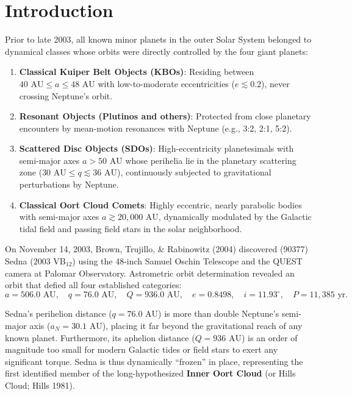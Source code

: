 \documentclass[11pt,a4paper]{article}
\begin{document}
\section{Introduction}
Prior to late 2003, all known minor planets in the outer Solar System belonged to dynamical classes whose orbits were directly controlled by the four giant planets:
\begin{enumerate}
    \item \textbf{Classical Kuiper Belt Objects (KBOs)}: Residing between $40\text{ AU} \le a \le 48\text{ AU}$ with low-to-moderate eccentricities ($e \lesssim 0.2$), never crossing Neptune's orbit.
    \item \textbf{Resonant Objects (Plutinos and others)}: Protected from close planetary encounters by mean-motion resonances with Neptune (e.g., 3:2, 2:1, 5:2).
    \item \textbf{Scattered Disc Objects (SDOs)}: High-eccentricity planetesimals with semi-major axes $a > 50\text{ AU}$ whose perihelia lie in the planetary scattering zone ($30\text{ AU} \le q \lesssim 36\text{ AU}$), continuously subjected to gravitational perturbations by Neptune.
    \item \textbf{Classical Oort Cloud Comets}: Highly eccentric, nearly parabolic bodies with semi-major axes $a \gtrsim 20,000\text{ AU}$, dynamically modulated by the Galactic tidal field and passing field stars in the solar neighborhood.
\end{enumerate}

On November 14, 2003, Brown, Trujillo, \& Rabinowitz (2004) discovered (90377) Sedna ($2003\text{ VB}_{12}$) using the 48-inch Samuel Oschin Telescope and the QUEST camera at Palomar Observatory. Astrometric orbit determination revealed an orbit that defied all four established categories:
\begin{equation}
a = 506.0\text{ AU}, \quad q = 76.0\text{ AU}, \quad Q = 936.0\text{ AU}, \quad e = 0.8498, \quad i = 11.93^\circ, \quad P = 11,385\text{ yr}.
\end{equation}

Sedna's perihelion distance ($q = 76.0\text{ AU}$) is more than double Neptune's semi-major axis ($a_N = 30.1\text{ AU}$), placing it far beyond the gravitational reach of any known planet. Furthermore, its aphelion distance ($Q = 936\text{ AU}$) is an order of magnitude too small for modern Galactic tides or field stars to exert any significant torque. Sedna is thus dynamically ``frozen'' in place, representing the first identified member of the long-hypothesized \textbf{Inner Oort Cloud} (or Hills Cloud; Hills 1981).
\end{document}
